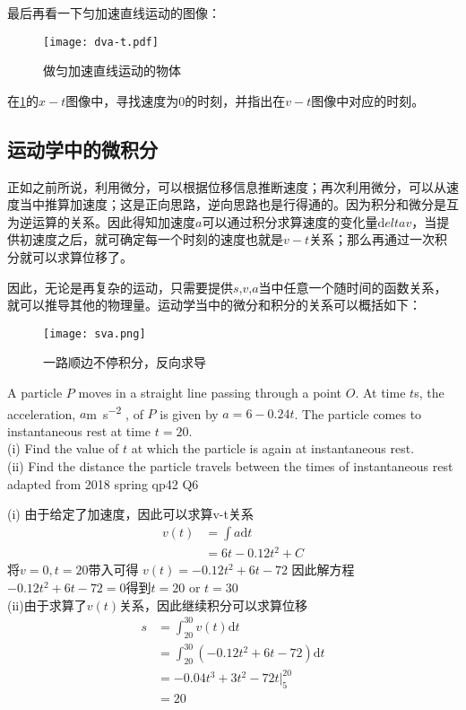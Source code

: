 最后再看一下匀加速直线运动的图像：
\begin{figure}[H]
\texttt{[image: dva-t.pdf]}
\label{fig:uniform acc}
\caption{做匀加速直线运动的物体}
\end{figure}

\begin{TaskBox}
在\ref{fig:uniform acc}的$x-t$图像中，寻找速度为$0$的时刻，并指出在$v-t$图像中对应的时刻。
\end{TaskBox}

\subsection*{运动学中的微积分}
正如之前所说，利用微分，可以根据位移信息推断速度；再次利用微分，可以从速度当中推算加速度；这是正向思路，逆向思路也是行得通的。因为积分和微分是互为逆运算的关系。因此得知加速度$a$可以通过积分求算速度的变化量$\mathrm{d}elta v$，当提供初速度之后，就可确定每一个时刻的速度也就是$v-t$关系；那么再通过一次积分就可以求算位移了。

因此，无论是再复杂的运动，只需要提供$s$,$v$,$a$当中任意一个随时间的函数关系，就可以推导其他的物理量。运动学当中的微分和积分的关系可以概括如下：
\begin{figure}[H]
\centering
\texttt{[image: sva.png]}
\caption{一路顺边不停积分，反向求导}
\end{figure}

\begin{ExampleBox}
A particle $P$ moves in a straight line passing through a point $O$. At time $t$\si{\s}, the acceleration, $a$\si{\m \per \square \s} , of $P$ is given by $a = 6 − 0.24t$. The particle comes to instantaneous rest at time $t = 20$.\\
(i) Find the value of $t$ at which the particle is again at instantaneous rest.\\
(ii) Find the distance the particle travels between the times of instantaneous rest\\
\makebox{}\hfill adapted from 2018 spring qp42 Q6

\tcblower
(i) 由于给定了加速度，因此可以求算v-t关系
\begin{align*}
	 v(t) &= \int a \mathrm{d} t \\
	  &=6t-0.12t^2+C
\end{align*}
将$v=0,t=20$带入可得 $v(t)=-0.12t^2+6t-72$
因此解方程$-0.12t^2+6t-72=0$得到$t=20$ or $t=30$\\

(ii)由于求算了$v(t)$关系，因此继续积分可以求算位移
\begin{align*}
	s &= \int_{20}^{30} v(t) \mathrm{d} t\\
	&= \int_{20}^{30} (-0.12t^2+6t-72) \mathrm{d} t\\
	&=-0.04t^3+3t^2-72t\bigg|^{20}_5\\
	&=20
\end{align*}
\end{ExampleBox}
\clearpage

